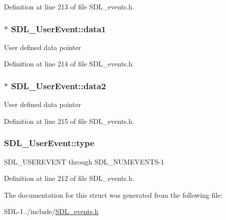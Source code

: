 Definition at line 213 of file S\+D\+L\+\_\+events.\+h.

\hypertarget{struct_s_d_l___user_event_ab2893a12be2f97195f16463a23107913}{}
\subsubsection[{data1}]{$\ast$ S\+D\+L\+\_\+\+User\+Event\+::data1}\label{struct_s_d_l___user_event_ab2893a12be2f97195f16463a23107913}
User defined data pointer 

Definition at line 214 of file S\+D\+L\+\_\+events.\+h.

\hypertarget{struct_s_d_l___user_event_aae4dbf65c34d654c9edf519eb061b7cf}{}
\subsubsection[{data2}]{$\ast$ S\+D\+L\+\_\+\+User\+Event\+::data2}\label{struct_s_d_l___user_event_aae4dbf65c34d654c9edf519eb061b7cf}
User defined data pointer 

Definition at line 215 of file S\+D\+L\+\_\+events.\+h.

\hypertarget{struct_s_d_l___user_event_a4ad7c1f518eef5dfedc09c9bab1d1e42}{}
\subsubsection[{type}]{ S\+D\+L\+\_\+\+User\+Event\+::type}\label{struct_s_d_l___user_event_a4ad7c1f518eef5dfedc09c9bab1d1e42}
S\+D\+L\+\_\+\+U\+S\+E\+R\+E\+V\+E\+N\+T through S\+D\+L\+\_\+\+N\+U\+M\+E\+V\+E\+N\+T\+S-\/1 

Definition at line 212 of file S\+D\+L\+\_\+events.\+h.



The documentation for this struct was generated from the following file\+:\begin{DoxyCompactItemize}
\item 
S\+D\+L-\/1../include/\hyperlink{_s_d_l__events_8h}{S\+D\+L\+\_\+events.\+h}\end{DoxyCompactItemize}
